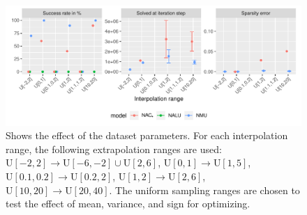 \begin{figure}[h]
\includegraphics[width=\linewidth,trim={0 0 0 0.809cm},clip]{results/simple_function_static_range.pdf}
\caption{Shows the effect of the dataset parameters. For each interpolation range, the following extrapolation ranges are used: ${\mathrm{U}[-2,2] \rightarrow \mathrm{U}[-6,-2] \cup \mathrm{U}[2,6]}$, ${\mathrm{U}[0,1] \rightarrow \mathrm{U}[1,5]}$, ${\mathrm{U}[0.1,0.2] \rightarrow \mathrm{U}[0.2,2]}$, ${\mathrm{U}[1,2] \rightarrow \mathrm{U}[2,6]}$, ${\mathrm{U}[10, 20] \rightarrow \mathrm{U}[20, 40]}$. The uniform sampling ranges are chosen to test the effect of mean, variance, and sign for optimizing.}
\label{fig:simple-function-static-boundary}
\end{figure}
